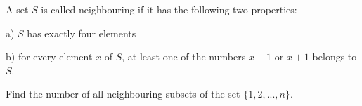 A set $S$ is called neighbouring  if it has the following two properties:

a)	$S$ has exactly four elements

b)	for every element $x$ of $S$,  at least one of the numbers $x - 1$ or $x+1$ belongs to $S$.

Find the number of all neighbouring  subsets of the set $\{1,2,... ,n\}$.